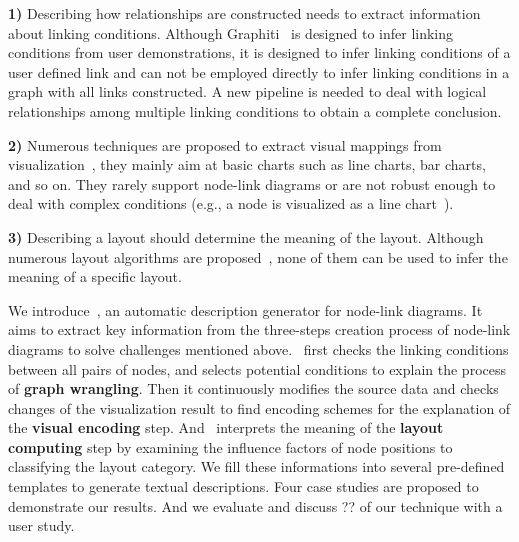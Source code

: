 \noindent \textbf{1)} 
Describing how relationships are constructed needs to extract information about linking conditions.
Although Graphiti~\cite{DBLP:journals/tvcg/SrinivasanPEB18} is designed to infer linking conditions from user demonstrations, it is designed to infer linking conditions of a user defined link and can not be employed directly to infer linking conditions in a graph with all links constructed.
A new pipeline is needed to deal with logical relationships among multiple linking conditions to obtain a complete conclusion.

\noindent \textbf{2)} %
Numerous techniques are proposed to extract visual mappings from visualization~\cite{DBLP:conf/uist/HarperA14, DBLP:journals/tvcg/HoqueA20, DBLP:journals/corr/abs-2103-00741},  they mainly aim at basic charts such as line charts, bar charts, and so on.
They rarely support node-link diagrams or are not robust enough to deal with complex conditions (e.g., a node is visualized as a line chart~\cite{DBLP:journals/bmcbi/JunkerKS06}).

\noindent \textbf{3)} Describing a layout should determine the meaning of the layout.
Although numerous layout algorithms are proposed~\cite{hachul2004drawing, DBLP:journals/spe/FruchtermanR91, DBLP:conf/gd/GansnerKN04, DBLP:conf/gd/BrandesP06, DBLP:journals/tvcg/ZhuCHHLZ21}, none of them can be used to infer the meaning of a specific layout.

We introduce~\textit{\ApproachName}, an automatic description generator for node-link diagrams.
It aims to extract key information from the three-steps creation process of node-link diagrams to solve challenges mentioned above.
\ApproachName~first checks the linking conditions between all pairs of nodes, and selects potential conditions to explain the process of \textbf{graph wrangling}.
Then it continuously modifies the source data and checks changes of the visualization result to find encoding schemes for the explanation of the \textbf{visual encoding} step.
And \ApproachName~interprets the meaning of the \textbf{layout computing} step by examining the influence factors of node positions to classifying the layout category.
We fill these informations into several pre-defined templates to generate textual descriptions.
Four case studies are proposed to demonstrate our results.
{\color{red} And we evaluate and discuss ?? of our technique with a user study.}